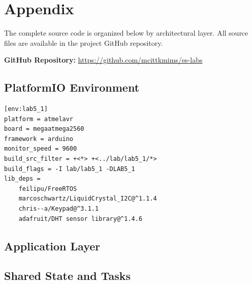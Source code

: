 \section{Appendix}

The complete source code is organized below by architectural layer. All source files are available in the project GitHub repository.

\textbf{GitHub Repository:} \url{https://github.com/mcittkmims/es-labs}

\subsection{PlatformIO Environment}

\begin{lstlisting}[caption=PlatformIO Lab 5.1 environment, label=lst:appendix_platformio]
[env:lab5_1]
platform = atmelavr
board = megaatmega2560
framework = arduino
monitor_speed = 9600
build_src_filter = +<*> +<../lab/lab5_1/*>
build_flags = -I lab/lab5_1 -DLAB5_1
lib_deps =
    feilipu/FreeRTOS
    marcoschwartz/LiquidCrystal_I2C@^1.1.4
    chris--a/Keypad@^3.1.1
    adafruit/DHT sensor library@^1.4.6
\end{lstlisting}

\subsection{Application Layer}









\subsection{Shared State and Tasks}




